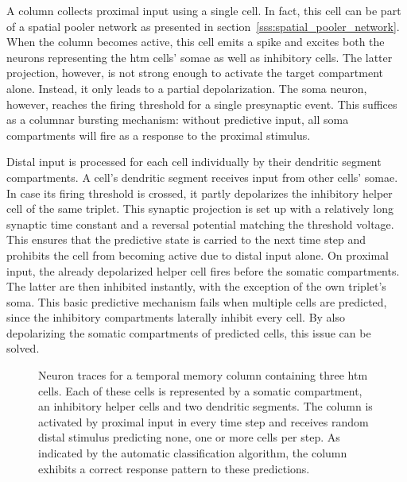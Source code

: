 A column collects proximal input using a single cell. In fact, this cell can be part of a spatial pooler network as presented in section~\ref{sss:spatial_pooler_network}. When the column becomes active, this cell emits a spike and excites both the neurons representing the \gls{htm} cells' somae as well as inhibitory cells. The latter projection, however, is not strong enough to activate the target compartment alone. Instead, it only leads to a partial depolarization. The soma neuron, however, reaches the firing threshold for a single presynaptic event. This suffices as a columnar bursting mechanism: without predictive input, all soma compartments will fire as a response to the proximal stimulus.

Distal input is processed for each cell individually by their dendritic segment compartments. A cell's dendritic segment receives input from other cells' somae. In case its firing threshold is crossed, it partly depolarizes the inhibitory helper cell of the same triplet. This synaptic projection is set up with a relatively long synaptic time constant and a reversal potential matching the threshold voltage. This ensures that the predictive state is carried to the next time step and prohibits the cell from becoming active due to distal input alone. On proximal input, the already depolarized helper cell fires before the somatic compartments. The latter are then inhibited instantly, with the exception of the own triplet's soma. This basic predictive mechanism fails when multiple cells are predicted, since the inhibitory compartments laterally inhibit every cell. By also depolarizing the somatic compartments of predicted cells, this issue can be solved.

\begin{figure}[p]
	\begin{center}
		
	\end{center}
	\caption{Neuron traces for a temporal memory column containing three \gls{htm} cells. Each of these cells is represented by a somatic compartment, an inhibitory helper cells and two dendritic segments. The column is activated by proximal input in every time step and receives random distal stimulus predicting none, one or more cells per step. As indicated by the automatic classification algorithm, the column exhibits a correct response pattern to these predictions.}
	\label{fig:static_temporal_memory_traces}
\end{figure}
